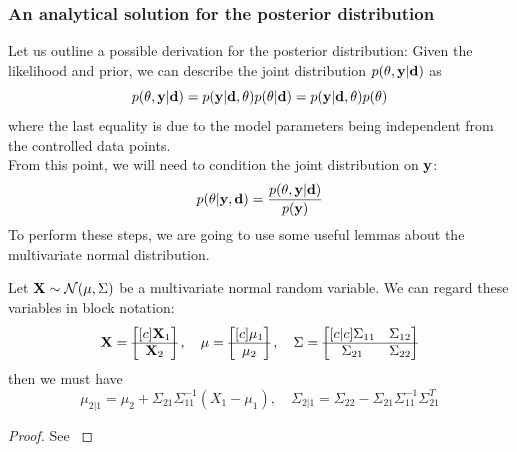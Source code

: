 \subsubsection{An analytical solution for the posterior distribution}
Let us outline a possible derivation for the posterior distribution: Given the likelihood and prior, we can describe the joint distribution $p(\theta, \mathbf{y} | \mathbf{d})$ as
\begin{equation}
  \label{eq:joint}
  p(\theta, \mathbf{y} | \mathbf{d}) = p(\mathbf{y} | \mathbf{d}, \theta)p(\theta | \mathbf{d}) = p(\mathbf{y} | \mathbf{d}, \theta)p(\theta)
\end{equation}
where the last equality is due to the model parameters being independent from the controlled data points. \\
From this point, we will need to condition the joint distribution on $\mathbf{y}$:
\begin{equation}
  \label{eq:joint-conditioned}
  p(\theta | \mathbf{y}, \mathbf{d}) = \frac{p(\theta, \mathbf{y} | \mathbf{d})}{p(\mathbf{y})}
\end{equation}
To perform these steps, we are going to use some useful lemmas about the multivariate normal distribution.
\begin{lemma}
  \label{lemma:block-conditional}
  Let $\mathbf{X} \sim \mathcal{N}(\mathbf{\mu}, \Sigma)$ be a multivariate normal random variable. We can regard these variables in block notation:
  \begin{equation}
  \mathbf{X}=\begin{bmatrix}[c]
    \mathbf{X}_1\\
    \hline
    \mathbf{X}_2
  \end{bmatrix}, \quad \mu = \begin{bmatrix}[c]
    \mu_{1}\\
    \hline
    \mu_{2}
  \end{bmatrix},\quad \Sigma=\begin{bmatrix}[c|c]
  \Sigma_{11} & \Sigma_{12}\\
    \hline
    \Sigma_{21} & \Sigma_{22}
  \end{bmatrix}
\end{equation}
  then we must have
  \begin{equation}\mu_{2|1}=\mu_2 + \Sigma_{21}\Sigma_{11}^{-1}(X_1 - \mu_1),\quad \Sigma_{2|1} = \Sigma_{22} - \Sigma_{21}\Sigma_{11}^{-1}\Sigma_{21}^T\end{equation}
\end{lemma}
\begin{proof}
  See \citet{krause22}
\end{proof}
